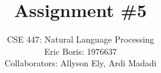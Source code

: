 \title{Assignment \#5} 
\author{\normalsize{CSE 447: Natural Language Processing}\\ 
\normalsize{Eric Boris: 1976637}\\
\normalsize{Collaborators: Allyson Ely, Ardi Madadi}}
\maketitle

